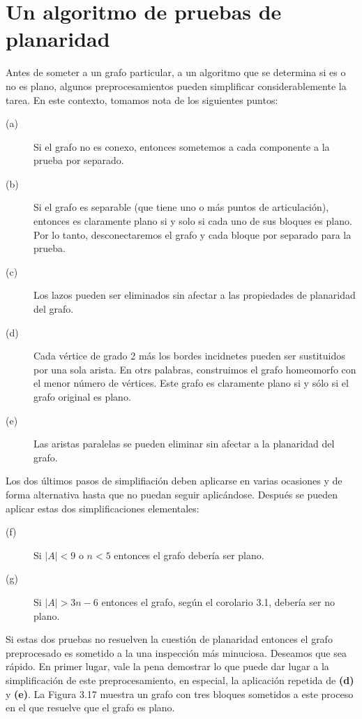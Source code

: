 \documentclass[10pt,a5paper]{book}
\begin{document}
\section{Un algoritmo de pruebas de planaridad}

Antes de someter a un grafo particular, a un algoritmo que se determina si es o no es plano, algunos preprocesamientos pueden simplificar considerablemente la tarea. En este contexto, tomamos nota de los siguientes puntos:
\begin{description}
\item[(a)] Si el grafo no es conexo, entonces sometemos a cada componente a la prueba por separado.
\item[(b)] Si el grafo es separable (que tiene uno o más puntos de articulación), entonces es claramente plano si y solo si cada uno de sus bloques es plano. Por lo tanto, desconectaremos el grafo y cada bloque por separado para la prueba.
\item[(c)] Los lazos pueden ser eliminados sin afectar a las propiedades de planaridad del grafo.
\item[(d)] Cada vértice de grado 2 más los bordes incidnetes pueden ser sustituidos por una sola arista. En otrs palabras, construimos el grafo homeomorfo con el menor número de vértices. Este grafo es claramente plano si y sólo si el grafo original es plano.
\item[(e)] Las aristas paralelas se pueden eliminar sin afectar a la planaridad del grafo.
\end{description}

Los dos últimos pasos de simplifiación deben aplicarse en varias ocasiones y de forma alternativa hasta que no puedan seguir aplicándose. Después se pueden aplicar estas dos simplificaciones elementales:
\begin{description}
\item[(f)] Si $|A| < 9$ o $n < 5$ entonces el grafo debería ser plano.
\item[(g)] Si $|A| > 3n -6$ entonces el grafo, según el corolario 3.1, debería ser no plano.
\end{description}

Si estas dos pruebas no resuelven la cuestión de planaridad entonces el grafo preprocesado es sometido a la una inspección más minuciosa. Deseamos que sea rápido. En primer lugar, vale la pena demostrar lo que puede dar lugar a la simplificación de este preprocesamiento, en especial, la aplicación repetida de \textbf{(d)} y \textbf{(e)}. La Figura 3.17 muestra un grafo con tres bloques sometidos a este proceso en el que resuelve que el grafo es plano.
\end{document}
